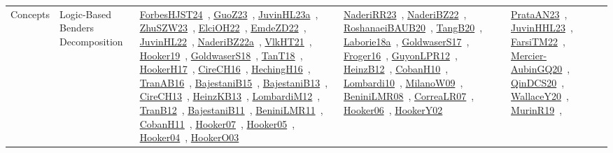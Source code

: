 {\begin{longtable}{lp{3cm}>{\raggedright\arraybackslash}p{6cm}>{\raggedright\arraybackslash}p{6cm}>{\raggedright\arraybackslash}p{8cm}}
Concepts & Logic-Based Benders Decomposition & \href{../works/ForbesHJST24.pdf}{ForbesHJST24}~\cite{ForbesHJST24}, \href{../works/GuoZ23.pdf}{GuoZ23}~\cite{GuoZ23}, \href{../works/JuvinHL23a.pdf}{JuvinHL23a}~\cite{JuvinHL23a}, \href{../works/ZhuSZW23.pdf}{ZhuSZW23}~\cite{ZhuSZW23}, \href{../works/ElciOH22.pdf}{ElciOH22}~\cite{ElciOH22}, \href{../works/EmdeZD22.pdf}{EmdeZD22}~\cite{EmdeZD22}, \href{../works/JuvinHL22.pdf}{JuvinHL22}~\cite{JuvinHL22}, \href{../works/NaderiBZ22a.pdf}{NaderiBZ22a}~\cite{NaderiBZ22a}, \href{../works/VlkHT21.pdf}{VlkHT21}~\cite{VlkHT21}, \href{../works/Hooker19.pdf}{Hooker19}~\cite{Hooker19}, \href{../works/GoldwaserS18.pdf}{GoldwaserS18}~\cite{GoldwaserS18}, \href{../works/TanT18.pdf}{TanT18}~\cite{TanT18}, \href{../works/HookerH17.pdf}{HookerH17}~\cite{HookerH17}, \href{../works/CireCH16.pdf}{CireCH16}~\cite{CireCH16}, \href{../works/HechingH16.pdf}{HechingH16}~\cite{HechingH16}, \href{../works/TranAB16.pdf}{TranAB16}~\cite{TranAB16}, \href{../works/BajestaniB15.pdf}{BajestaniB15}~\cite{BajestaniB15}, \href{../works/BajestaniB13.pdf}{BajestaniB13}~\cite{BajestaniB13}, \href{../works/CireCH13.pdf}{CireCH13}~\cite{CireCH13}, \href{../works/HeinzKB13.pdf}{HeinzKB13}~\cite{HeinzKB13}, \href{../works/LombardiM12.pdf}{LombardiM12}~\cite{LombardiM12}, \href{../works/TranB12.pdf}{TranB12}~\cite{TranB12}, \href{../works/BajestaniB11.pdf}{BajestaniB11}~\cite{BajestaniB11}, \href{../works/BeniniLMR11.pdf}{BeniniLMR11}~\cite{BeniniLMR11}, \href{../works/CobanH11.pdf}{CobanH11}~\cite{CobanH11}, \href{../works/Hooker07.pdf}{Hooker07}~\cite{Hooker07}, \href{../works/Hooker05.pdf}{Hooker05}~\cite{Hooker05}, \href{../works/Hooker04.pdf}{Hooker04}~\cite{Hooker04}, \href{../works/HookerO03.pdf}{HookerO03}~\cite{HookerO03} & \href{../works/NaderiRR23.pdf}{NaderiRR23}~\cite{NaderiRR23}, \href{../works/NaderiBZ22.pdf}{NaderiBZ22}~\cite{NaderiBZ22}, \href{../works/RoshanaeiBAUB20.pdf}{RoshanaeiBAUB20}~\cite{RoshanaeiBAUB20}, \href{../works/TangB20.pdf}{TangB20}~\cite{TangB20}, \href{../works/Laborie18a.pdf}{Laborie18a}~\cite{Laborie18a}, \href{../works/GoldwaserS17.pdf}{GoldwaserS17}~\cite{GoldwaserS17}, \href{../works/Froger16.pdf}{Froger16}~\cite{Froger16}, \href{../works/GuyonLPR12.pdf}{GuyonLPR12}~\cite{GuyonLPR12}, \href{../works/HeinzB12.pdf}{HeinzB12}~\cite{HeinzB12}, \href{../works/CobanH10.pdf}{CobanH10}~\cite{CobanH10}, \href{../works/Lombardi10.pdf}{Lombardi10}~\cite{Lombardi10}, \href{../works/MilanoW09.pdf}{MilanoW09}~\cite{MilanoW09}, \href{../works/BeniniLMR08.pdf}{BeniniLMR08}~\cite{BeniniLMR08}, \href{../works/CorreaLR07.pdf}{CorreaLR07}~\cite{CorreaLR07}, \href{../works/Hooker06.pdf}{Hooker06}~\cite{Hooker06}, \href{../works/HookerY02.pdf}{HookerY02}~\cite{HookerY02} & \href{../works/PrataAN23.pdf}{PrataAN23}~\cite{PrataAN23}, \href{../works/JuvinHHL23.pdf}{JuvinHHL23}~\cite{JuvinHHL23}, \href{../works/FarsiTM22.pdf}{FarsiTM22}~\cite{FarsiTM22}, \href{../works/Mercier-AubinGQ20.pdf}{Mercier-AubinGQ20}~\cite{Mercier-AubinGQ20}, \href{../works/QinDCS20.pdf}{QinDCS20}~\cite{QinDCS20}, \href{../works/WallaceY20.pdf}{WallaceY20}~\cite{WallaceY20}, \href{../works/MurinR19.pdf}{MurinR19}~\cite{MurinR19}, 
\end{longtable}}
